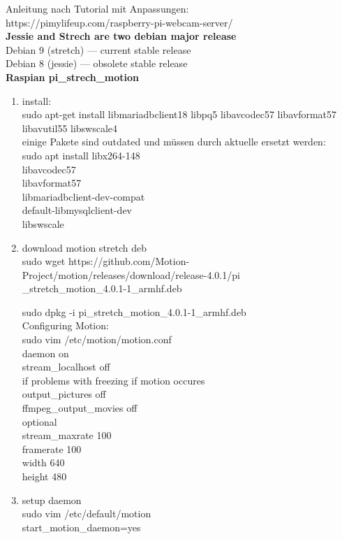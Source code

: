 Anleitung nach Tutorial mit Anpassungen:\\
https://pimylifeup.com/raspberry-pi-webcam-server/\\

\textbf{Jessie and Strech are two debian major release}\\
Debian 9 (stretch) — current stable release\\
Debian 8 (jessie) — obsolete stable release\\

\textbf{Raspian pi\_strech\_motion}

\begin{enumerate}
	\item install:\\
	sudo apt-get install libmariadbclient18 libpq5 libavcodec57  libavformat57 libavutil55 libswscale4\\
	einige Pakete sind outdated und müssen durch aktuelle ersetzt werden:\\
	sudo apt install libx264-148\\
	libavcodec57\\
	libavformat57\\
	libmariadbclient-dev-compat\\
	default-libmysqlclient-dev\\
	libswscale

	\item download motion stretch deb\\
	sudo wget https://github.com/Motion-Project/motion/releases/download/release-4.0.1/pi\\
	\_stretch\_motion\_4.0.1-1\_armhf.deb
	
	sudo dpkg -i pi\_stretch\_motion\_4.0.1-1\_armhf.deb\\

	Configuring Motion:\\
	sudo vim /etc/motion/motion.conf\\
	daemon on\\
	stream\_localhost off\\
	if problems with freezing if motion occures\\
	output\_pictures off\\
	ffmpeg\_output\_movies off\\
	optional\\
	stream\_maxrate 100\\
	framerate 100\\
	width 640\\
	height 480

	\item setup daemon\\
	sudo vim /etc/default/motion\\
	start\_motion\_daemon=yes
\end{enumerate}

